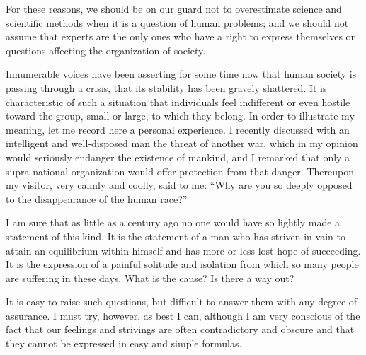 \documentclass[12pt]{article}
\begin{document}
For these reasons, we should be on our guard not to overestimate science and scientific methods when it is a question of human problems; and we should not assume that experts are the only ones who have a right to express themselves on questions affecting the organization of society.

Innumerable voices have been asserting for some time now that human society is passing through a crisis, that its stability has been gravely shattered. It is characteristic of such a situation that individuals feel indifferent or even hostile toward the group, small or large, to which they belong. In order to illustrate my meaning, let me record here a personal experience. I recently discussed with an intelligent and well-disposed man the threat of another war, which in my opinion would seriously endanger the existence of mankind, and I remarked that only a supra-national organization would offer protection from that danger. Thereupon my visitor, very calmly and coolly, said to me: “Why are you so deeply opposed to the disappearance of the human race?”

I am sure that as little as a century ago no one would have so lightly made a statement of this kind. It is the statement of a man who has striven in vain to attain an equilibrium within himself and has more or less lost hope of succeeding. It is the expression of a painful solitude and isolation from which so many people are suffering in these days. What is the cause? Is there a way out?

It is easy to raise such questions, but difficult to answer them with any degree of assurance. I must try, however, as best I can, although I am very conscious of the fact that our feelings and strivings are often contradictory and obscure and that they cannot be expressed in easy and simple formulas.
\end{document}
